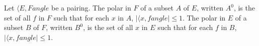 Let $\langle E, F 
angle$ be a pairing. The polar in $F$ of a subset $A$ of $E$, written $A^{0}$, is the set of all $f$ in $F$ such that for each $x$ in $A$, $|\langle x, f 
angle| \leq 1$. The polar in $E$ of a subset $B$ of $F$, written $B^{0}$, is the set of all $x$ in $E$ such that for each $f$ in $B$, $|\langle x, f 
angle| \leq 1$.
